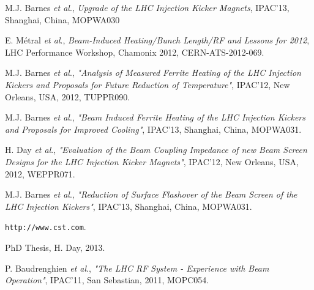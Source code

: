 \documentclass[a4paper,
              ]{jacow}
\begin{document}
\begin{thebibliography}{9}

M.J. Barnes \emph{et al}., \emph{Upgrade of the LHC Injection Kicker Magnets}, IPAC'13, Shanghai, China, MOPWA030

E. Métral \emph{et al}., \emph{Beam-Induced Heating/Bunch Length/RF and Lessons for 2012}, LHC Performance Workshop, Chamonix 2012, CERN-ATS-2012-069. 

M.J. Barnes \emph{et al}., \emph{"Analysis of Measured Ferrite Heating of the LHC Injection Kickers and Proposals for Future Reduction of Temperature"}, IPAC'12, New Orleans, USA, 2012, TUPPR090.

M.J. Barnes \emph{et al}., \emph{"Beam Induced Ferrite Heating of the LHC Injection Kickers and Proposals for Improved Cooling"}, IPAC'13, Shanghai, China, MOPWA031.

H. Day \emph{et al}., \emph{"Evaluation of the Beam Coupling Impedance of new Beam Screen Designs for the LHC Injection Kicker Magnets"}, IPAC'12, New Orleans, USA, 2012, WEPPR071.

M.J. Barnes \emph{et al}., \emph{"Reduction of Surface Flashover of the Beam Screen of the LHC Injection Kickers"}, IPAC'13, Shanghai, China, MOPWA031.

\texttt{http://www.cst.com}.

PhD Thesis, H. Day, 2013.

P. Baudrenghien \emph{et al}., \emph{"The LHC RF System - Experience with Beam Operation"}, IPAC'11, San Sebastian, 2011, MOPC054.


\end{thebibliography}
\end{document}
